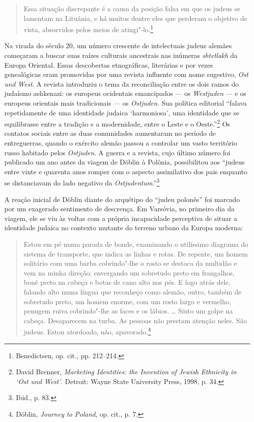 \begin{quote}
Essa situação discrepante é a causa da posição falsa em que os judeus se
lamentam na Lituânia, e há muitos dentre eles que perderam o objetivo de
vista, absorvidos pelos meios de atingi"-lo.\footnote{Benedictsen, op.
  cit., pp. 212--214.}
\end{quote}

Na virada do século 20, um número crescente de intelectuais judeus
alemães começaram a buscar suas raízes culturais ancestrais nas inúmeras
\emph{shtetlakh} da Europa Oriental. Essas descobertas etnográficas,
literárias e por vezes genealógicas eram promovidas por uma revista
influente com nome sugestivo, \emph{Ost und West}. A revista introduziu
o tema da reconciliação entre os dois ramos do judaísmo ashkenazi: os
europeus ocidentais emancipados --- os \emph{Westjuden} --- e os europeus
orientais mais tradicionais --- os \emph{Ostjuden}. Sua política editorial
``falava repetidamente de uma identidade judaica `harmoniosa', uma
identidade que se equilibrasse entre a tradição e a modernidade, entre o
Leste e o Oeste.''\footnote{David Brenner, \emph{Marketing Identities:
  the Invention of Jewish Ethnicity in `Ost und West'}. Detroit: Wayne
  State University Press, 1998, p. 34.} Os contatos sociais entre as
duas comunidades aumentaram no período de entreguerras, quando o
exército alemão passou a controlar um vasto território russo habitado
pelos \emph{Ostjuden}. A guerra e a revista, cujo último número foi
publicado um ano antes da viagem de Döblin à Polônia, possibilitou aos
``judeus entre vinte e quarenta anos romper com o aspecto assimilativo
dos pais enquanto se distanciavam do lado negativo da
\emph{Ostjudentum}.''\footnote{Ibid., p. 83.}

A reação inicial de Döblin diante do arquétipo do ``judeu polonês'' foi
marcado por um exagerado sentimento de descrença. Em Varsóvia, no
primeiro dia da viagem, ele se viu às voltas com a própria incapacidade
perceptiva de situar a identidade judaica no contexto mutante do terreno
urbano da Europa moderna:

\begin{quote}
Estou em pé numa parada de bonde, examinando o utilíssimo diagrama do
sistema de transporte, que indica as linhas e rotas. De repente, um
homem solitário com uma barba cobrindo"-lhe o rosto se destaca da
multidão e vem na minha direção: envergando um sobretudo preto em
frangalhos, boné preto na cabeça e botas de cano alto nos pés. E logo
atrás dele, falando alto numa língua que reconheço como alemão, outro,
também de sobretudo preto, um homem enorme, com um rosto largo e
vermelho, penugem ruiva cobrindo"-lhe as faces e os lábios. \ldots{}
Sinto um golpe na cabeça. Desaparecem na turba. As pessoas não prestam
atenção neles. São judeus. Estou atordoado, não, apavorado.\footnote{Döblin,
  \emph{Journey to Poland}, op. cit., p. 7.}
\end{quote}

